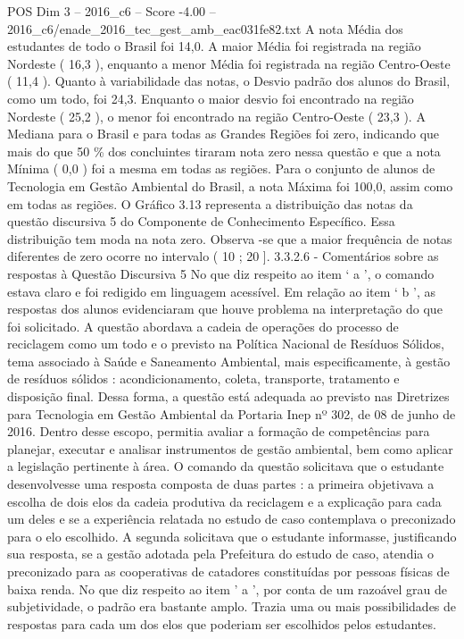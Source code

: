 \begin{textsample}{POS Dim 3 – 2016\_c6 – Score -4.00 – 2016\_c6/enade\_2016\_tec\_gest\_amb\_eac031fe82.txt}
A nota Média dos estudantes de todo o Brasil foi 14,0.
A maior Média foi registrada na região Nordeste ( 16,3 ), enquanto a menor Média foi registrada na região Centro-Oeste ( 11,4 ).
Quanto à variabilidade das notas, o Desvio padrão dos alunos do Brasil, como um todo, foi 24,3.
Enquanto o maior desvio foi encontrado na região Nordeste ( 25,2 ), o menor foi encontrado na região Centro-Oeste ( 23,3 ).
A Mediana para o Brasil e para todas as Grandes Regiões foi zero, indicando que mais do que 50 \% dos concluintes tiraram nota zero nessa questão e que a nota Mínima ( 0,0 ) foi a mesma em todas as regiões.
Para o conjunto de alunos de Tecnologia em Gestão Ambiental do Brasil, a nota Máxima foi 100,0, assim como em todas as regiões.
O Gráfico 3.13 representa a distribuição das notas da questão discursiva 5 do Componente de Conhecimento Específico.
Essa distribuição tem moda na nota zero.
Observa -se que a maior frequência de notas diferentes de zero ocorre no intervalo ( 10 ; 20 ]. 3.3.2.6 - Comentários sobre as respostas à Questão Discursiva 5 No que diz respeito ao item ‘ a ’, o comando estava claro e foi redigido em linguagem acessível.
Em relação ao item ‘ b ’, as respostas dos alunos evidenciaram que houve problema na interpretação do que foi solicitado.
A questão abordava a cadeia de operações do processo de reciclagem como um todo e o previsto na Política Nacional de Resíduos Sólidos, tema associado à Saúde e Saneamento Ambiental, mais especificamente, à gestão de resíduos sólidos : acondicionamento, coleta, transporte, tratamento e disposição final.
Dessa forma, a questão está adequada ao previsto nas Diretrizes para Tecnologia em Gestão Ambiental da Portaria Inep nº 302, de 08 de junho de 2016.
Dentro desse escopo, permitia avaliar a formação de competências para planejar, executar e analisar instrumentos de gestão ambiental, bem como aplicar a legislação pertinente à área.
O comando da questão solicitava que o estudante desenvolvesse uma resposta composta de duas partes : a primeira objetivava a escolha de dois elos da cadeia produtiva da reciclagem e a explicação para cada um deles e se a experiência relatada no estudo de caso contemplava o preconizado para o elo escolhido.
A segunda solicitava que o estudante informasse, justificando sua resposta, se a gestão adotada pela Prefeitura do estudo de caso, atendia o preconizado para as cooperativas de catadores constituídas por pessoas físicas de baixa renda.
No que diz respeito ao item ’ a ’, por conta de um razoável grau de subjetividade, o padrão era bastante amplo.
Trazia uma ou mais possibilidades de respostas para cada um dos elos que poderiam ser escolhidos pelos estudantes.

\end{textsample}
